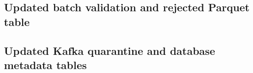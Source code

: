 \documentclass[11pt,letterpaper]{article}
\newcommand{\reportdir}{.}
\newcommand{\reportdir}{documentation}
\newcommand{\validationroot}{\reportdir/evidence/validation-1AYnOc}
\begin{document}
\subsection{Updated batch validation and rejected Parquet table}\label{app:batch-validation}


\subsection{Updated Kafka quarantine and database metadata tables}\label{app:stream-validation}

\end{document}
